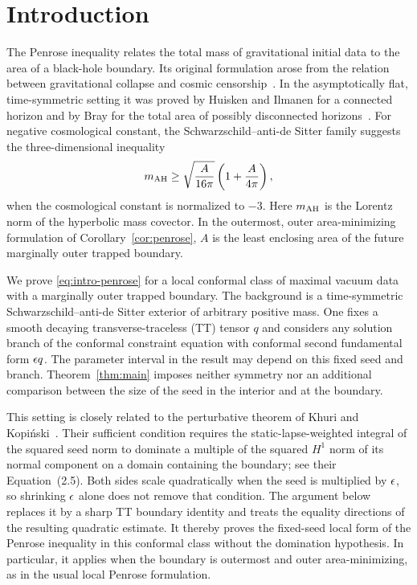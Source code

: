 \section{Introduction}\label{sec:introduction}

The Penrose inequality relates the total mass of gravitational initial
data to the area of a black-hole boundary. Its original formulation arose
from the relation between gravitational collapse and cosmic
censorship~\cite{Penrose1973}. In the asymptotically flat,
time-symmetric setting it was proved by Huisken and Ilmanen for a
connected horizon and by Bray for the total area of possibly disconnected
horizons~\cite{HuiskenIlmanen2001,Bray2001}. For negative cosmological
constant, the Schwarzschild--anti-de Sitter family suggests the
three-dimensional inequality
\begin{equation}\label{eq:intro-penrose}
 m_{\mathrm{AH}}\geq
 \sqrt{\frac{A}{16\pi}}\left(1+\frac{A}{4\pi}\right),
\end{equation}
when the cosmological constant is normalized to $-3$.
Here $m_{\mathrm{AH}}$ is the Lorentz norm of the hyperbolic mass covector.
In the outermost, outer area-minimizing formulation of
Corollary~\ref{cor:penrose}, $A$ is the least enclosing area of the
future marginally outer trapped boundary.

We prove \eqref{eq:intro-penrose} for a local conformal class of
maximal vacuum data with a marginally outer trapped boundary.
The background is a time-symmetric Schwarzschild--anti-de Sitter
exterior of arbitrary positive mass. One fixes a smooth decaying
transverse-traceless (TT) tensor $q$ and considers any solution branch of
the conformal constraint equation with conformal second fundamental
form $\epsilon q$. The parameter interval in the result may depend on this
fixed seed and branch. Theorem~\ref{thm:main} imposes neither symmetry
nor an additional comparison between the size of the seed in the
interior and at the boundary.

This setting is closely related to the perturbative theorem of
Khuri and Kopi\'nski~\cite[Theorem~2]{KhuriKopinski2023}.
Their sufficient condition requires the static-lapse-weighted integral
of the squared seed norm to dominate a multiple of the squared $H^1$
norm of its normal component on a domain containing the boundary;
see their Equation~(2.5). Both sides scale quadratically when the seed is
multiplied by $\epsilon$, so shrinking $\epsilon$ alone does not remove that
condition. The argument below replaces it by a sharp TT boundary
identity and treats the equality directions of the resulting
quadratic estimate. It thereby proves the fixed-seed local form
of the Penrose inequality in this conformal class without the
domination hypothesis. In particular, it applies when the boundary
is outermost and outer area-minimizing, as in the usual local
Penrose formulation.

